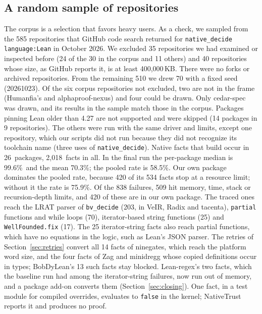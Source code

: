 \documentclass[11pt]{article}
\newcommand{\vsamppkg}{26}   %
\newcommand{\vsampfacts}{2,018}   %
\newcommand{\vsamprate}{58.5\%}   %
\newcommand{\vsampmedian}{99.6\%}   %
\newcommand{\vsampmean}{70.3\%}   %
\newcommand{\vsampwoBigrate}{75.9\%}   %
\begin{document}
\subsection{A random sample of repositories}\label{sec:sample}
The corpus is a selection that favors heavy users. As a check, we sampled from the 585
repositories that GitHub code search returned for \verb|native_decide language:Lean| in October
2026. We excluded 35 repositories we had examined or inspected before (24 of the 30 in the corpus
and 11 others) and 40 repositories whose size, as GitHub reports it, is at least 400,000\,KB. There were no forks or
archived repositories. From
the remaining 510 we drew 70 with a fixed seed (20261023). Of the six corpus repositories not
excluded, two are not in the frame (Humanfia's and alphaproof-nexus) and four could be drawn. Only
cedar-spec was drawn, and its results in the sample match those in the corpus. Packages
pinning Lean older than 4.27 are not supported and were skipped (14 packages in 9 repositories). The
others were run with the same driver and limits, except one repository, which our scripts did not run
because they did not recognize its toolchain name (three uses of \texttt{native\_decide}). Native facts that
build occur in \vsamppkg\ packages, \vsampfacts\ facts in all. In the final run the per-package median is
\vsampmedian\ and the mean \vsampmean; the pooled rate is \vsamprate. Our own package dominates the pooled
rate, because 420 of its 534 facts stop at a resource limit; without it the rate is \vsampwoBigrate. Of the 838
failures, 509 hit memory, time, stack or recursion-depth limits, and 420 of these are in our own package. The
traced ones reach the LRAT parser of \texttt{bv\_decide} (203, in VeIR, Radix and tacenta), \texttt{partial}
functions and while loops (70), iterator-based string functions (25) and \texttt{WellFounded.fix} (17). The
25 iterator-string facts also reach partial functions, which have no equations in the logic, such as Lean's
JSON parser. The retries of Section~\ref{sec:retries} convert all 14 facts of ninegates, which reach the
platform word size, and the four facts of Zag and minidregg whose copied definitions occur in types;
BobDyLean's 13 such facts stay blocked. Lean-regex's two facts, which the baseline run had among the
iterator-string failures, now run out of memory, and a package add-on converts them
(Section~\ref{sec:closing}). One fact, in a test module for compiled overrides, evaluates to \texttt{false} in the kernel;
NativeTrust reports it and produces no proof.
\end{document}
